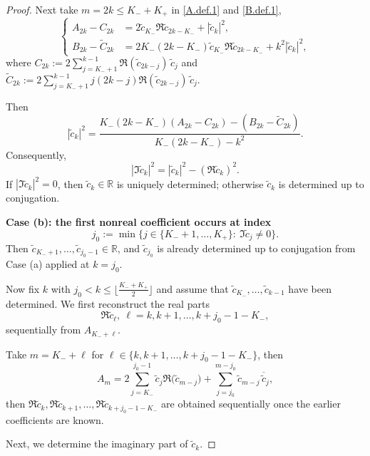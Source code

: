 \documentclass[11pt,oneside,reqno]{amsart}
\numberwithin{equation}{section}
\def\R{ {\mathbb R} }
\begin{document}
\begin{proof}
Next take $m=2k\le K_-+K_+$ in \eqref{A.def.1} and \eqref{B.def.1},
\[
\left\{
\begin{aligned}
A_{2k}-C_{2k}&=2\tilde c_{K_-}\Re\tilde c_{2k-K_-}+|\tilde c_k|^2,\\
B_{2k}-\widetilde C_{2k}&=2K_-(2k-K_-)\tilde c_{K_-}\Re\tilde c_{2k-K_-}+k^2|\tilde c_k|^2,
\end{aligned}
\right.
\]
where 
$C_{2k}:=2\sum_{j=K_-+1}^{k-1}\Re(\tilde c_{2k-j})\,\tilde c_j$ and 
$\widetilde C_{2k}:=2\sum_{j=K_-+1}^{k-1}j(2k-j)\Re(\tilde c_{2k-j})\,\tilde c_j.$

Then 
\begin{equation}\label{S3:absck}
|\tilde c_k|^2=
\frac{K_-(2k-K_-)(A_{2k}-C_{2k})-(B_{2k}-\widetilde C_{2k})}
     {K_-(2k-K_-)-k^2}.
\end{equation}
Consequently,
\[
|\Im\tilde c_k|^2=|\tilde c_k|^2-(\Re\tilde c_k)^2.
\]
If $|\Im\tilde c_k|^2=0$, then $\tilde c_k\in\R$ is uniquely determined; otherwise
$\tilde c_k$ is determined up to conjugation.

\medskip
\noindent\textbf{Case (b): the first nonreal coefficient occurs at index
\[
j_0:=\min\{j\in\{K_-+1,\ldots, K_+\}:\ \Im\tilde c_j\neq0\}.
\]}
Then $\tilde c_{K_-+1},\ldots,\tilde c_{j_0-1}\in\R$, and $\tilde c_{j_0}$ is already
determined up to conjugation from Case (a) applied at $k=j_0$. 

Now fix $k$ with $j_0<k\le \lfloor\frac{K_-+K_+}{2}\rfloor$ and assume that
$\tilde c_{K_-},\ldots,\tilde c_{k-1}$ have been determined.
We first reconstruct the real parts
\[
\Re\tilde c_\ell,\ \ell=k,k+1,\ldots,k+j_0-1-K_-,
\]
sequentially from $A_{K_-+\ell}$.

Take $m=K_-+\ell$ for $\ell\in \{k,k+1,\ldots,k+j_0-1-K_-\}$, then 
\begin{equation*}\label{step3:Re-seq}
A_{m}=2\sum_{j=K_-}^{j_0-1}\tilde c_{j}\Re\big(\tilde c_{m-j}\big)+\sum_{j=j_0}^{m-j_0}\tilde c_{m-j}\,\overline{\tilde c}_j,
\end{equation*}
then  $\Re\tilde c_{k},\Re\tilde c_{k+1},\ldots, \Re \tilde c_{k+j_0-1-K_-}$ are obtained
sequentially once the earlier coefficients are known.


\smallskip
Next, we determine the imaginary part of $\tilde c_k$. 


\end{proof}
\end{document}

